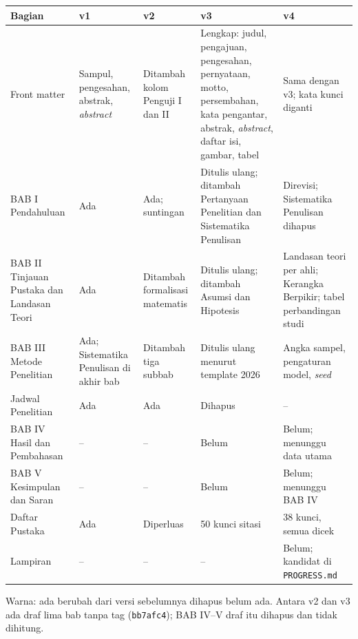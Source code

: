 \documentclass[a4paper,10pt]{article}
\begin{document}
\begin{tabularx}{\linewidth}{L{3.6cm} Y Y Y Y}
\toprule
\textbf{Bagian} & \textbf{v1} & \textbf{v2} & \textbf{v3} & \textbf{v4} \\
\midrule
Front matter & Sampul, pengesahan, abstrak, \textit{abstract} & Ditambah kolom Penguji I dan II & Lengkap: judul, pengajuan, pengesahan, pernyataan, motto, persembahan, kata pengantar, abstrak, \textit{abstract}, daftar isi, gambar, tabel & Sama dengan v3; kata kunci diganti \\
BAB I Pendahuluan & Ada & Ada; suntingan & Ditulis ulang; ditambah Pertanyaan Penelitian dan Sistematika Penulisan & Direvisi; Sistematika Penulisan dihapus \\
BAB II Tinjauan Pustaka dan Landasan Teori & Ada & Ditambah formalisasi matematis & Ditulis ulang; ditambah Asumsi dan Hipotesis & Landasan teori per ahli; Kerangka Berpikir; tabel perbandingan studi \\
BAB III Metode Penelitian & Ada; Sistematika Penulisan di akhir bab & Ditambah tiga subbab & Ditulis ulang menurut template 2026 & Angka sampel, pengaturan model, \textit{seed} \\
Jadwal Penelitian & Ada & Ada & Dihapus & -- \\
BAB IV Hasil dan Pembahasan & -- & -- & Belum & Belum; menunggu data utama \\
BAB V Kesimpulan dan Saran & -- & -- & Belum & Belum; menunggu BAB IV \\
Daftar Pustaka & Ada & Diperluas & 50 kunci sitasi & 38 kunci, semua dicek \\
Lampiran & -- & -- & -- & Belum; kandidat di \texttt{PROGRESS.md} \\
\bottomrule
\end{tabularx}

\vspace{2pt}
{\scriptsize Warna: \colorbox{sada}{ada} \colorbox{subah}{berubah dari versi sebelumnya} \colorbox{shapus}{dihapus} \colorbox{sbelum}{belum ada}. Antara v2 dan v3 ada draf lima bab tanpa tag (\texttt{bb7afc4}); BAB IV--V draf itu dihapus dan tidak dihitung.}
\end{document}
